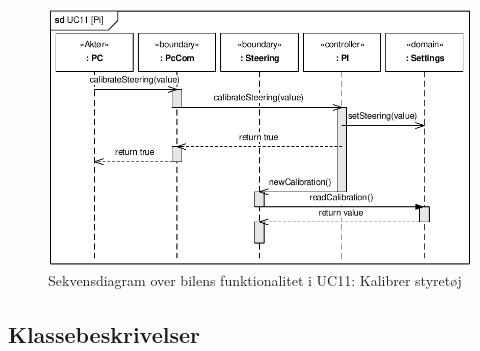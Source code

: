 \begin{figure}[h]
\centering
\includegraphics[]{../fig/diagrammer/bil/sd_uc11.pdf}
\caption{Sekvensdiagram over  bilens funktionalitet i UC11: Kalibrer styretøj}
\label{fig:sd_uc11_bil}
\end{figure}

\clearpage
\subsection{Klassebeskrivelser}

\clearpage
